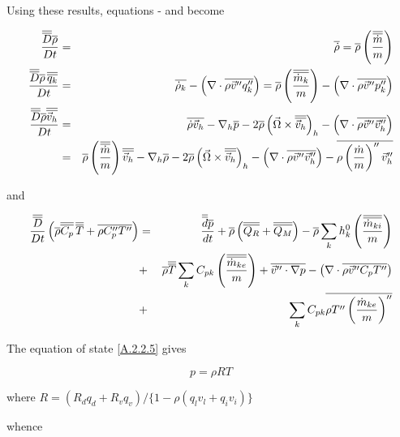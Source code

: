 Using these results, equations  -  and 
 become

\begin{eqnarray}
\frac{\overline{\overline{D}}\overline{\rho}}{Dt}&=&\overline{\dot{\rho}}=\overline{\rho}
\left(\frac{\overline{\overline{\dot{m}}}}{m}\right)
\label{A.4.1}\\
\frac{\overline{\overline{D}}\overline{\rho}\,\overline{\overline{q_{k}}}}{Dt}&=&\overline{\dot{\rho}_{k}}-
\left(\nabla \cdot
\overline{\rho\vec{v}''q_{k}''}\right)=\overline{\rho}\left(
\frac{\overline{\overline{\dot{m}_{k}}}}{m}\right)-
\left(\nabla\cdot\overline{\rho\vec{v}''p_{k}''}\right)
\label{A.4.2}\\
\frac{\overline{\overline{D}}\overline{\rho}\overline{\overline{\vec{v}_{h}}}}{Dt}&=&\overline{\dot{\rho}\vec{v}_{h}}-
\nabla_{h}\overline{p}-2\overline{\rho}\left(\vec{\Omega} \times
\overline{\overline{\vec{v}_{h}}}\right)_{h}-\left(\nabla \cdot
\overline{\rho\vec{v}''\vec{v}''_{h}}\right)\label{A.4.3}\\
&=&\overline{\rho}\left(\frac{\overline{\overline{\dot{m}}}}{m}\right)\overline{\overline{\vec{v}_{h}}}-\nabla_{h}
\overline{\rho}-2\overline{\rho}\left(\vec{\Omega} \times \overline{\overline{\vec{v}_{h}}}\right)_{h}
-\left(\nabla \cdot \overline{\rho\vec{v}''\vec{v}''_{h}}\right)
-\overline{\rho\left(
\frac{\dot{m}}{m}\right)''\vec{v}''_{h}}\nonumber
\end{eqnarray}

and

\begin{eqnarray}
\frac{\overline{\overline{D}}}{Dt}\left(\overline{\rho}\overline{\overline{C_{p}}}\,\overline{\overline{T}}+
\overline{\rho C_{p}''T''}\right)&=&\frac{\overline{\overline{d}}\overline{p}}{dt}+
\overline{\rho}\left(\overline{\overline{Q_{R}}}
+\overline{\overline{Q_{M}}}\right)
-\overline{\rho}\sum_{k}
h_{k}^0\left(\frac{\overline{\overline{\dot{m}_{ki}}}}{m}\right)\nonumber\\
&+&\overline{\rho}\overline{\overline{T}}\sum_{k}C_{pk}\left(\frac{\overline{\overline{\dot{m}_{ke}}}}{m}\right)
+\overline{\vec{v}'' \cdot \nabla p}-
\left(\nabla \cdot \overline{\rho\vec{v}''C_{p}T''}\right)\label{A.4.4}\\
&+&\sum_{k} C_{pk}\overline{\rho T''\left( \frac{\dot{m}_{ke}}{m} 
\right)''}\nonumber
\end{eqnarray}


The equation of state \ref{A.2.2.5} gives

\begin{equation}
p=\rho RT\label{A.4.5}
\end{equation}


where $R=(R_{d}q_{d}+R_{v}q_{v})/\{1-\rho (q_{l}v_{l}+q_{i}v_{i})\}$

whence


